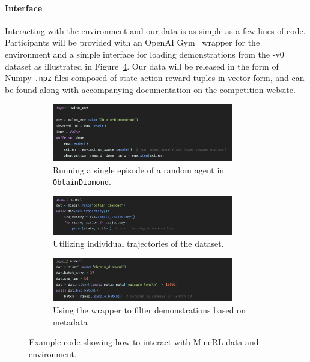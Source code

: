 \paragraph{Interface}
Interacting with the environment and our data is as simple as a few lines of code.
Participants will be provided with an OpenAI Gym~\cite{gym} wrapper for the environment and a simple interface for loading demonstrations from the \minenet-v0 dataset as illustrated in Figure~\ref{fig:example_code}. 
Our data will be released in the form of Numpy \texttt{.npz} files composed of state-action-reward tuples in vector form,
and can be found along with accompanying documentation on the competition website.

\begin{figure}
    \centering
    \begin{subfigure}[b]{0.87\textwidth}
    \centering 
        \includegraphics[width=0.87\textwidth]{./assets/malmo_env.png}
        \caption{\small Running a single episode of a random agent in \texttt{ObtainDiamond}. } 
        \label{fig:env_code}
    \end{subfigure}

    \begin{subfigure}[b]{0.87\textwidth}
    \centering
        \includegraphics[width=0.87\textwidth]{./assets/mineral_dat_1.png}
        \caption{\small Utilizing individual trajectories of the \minenet dataset.} 
        \label{fig:mineral_code_1}
    \end{subfigure}

\begin{subfigure}[b]{0.87\textwidth}
    \centering
        \includegraphics[width=0.87\textwidth]{./assets/mineral_dat_2.png}
        \caption{\small Using the \minenet  wrapper to filter demonstrations based on metadata} 
        \label{fig:mineral_code_2}
\end{subfigure}
\caption{\small Example code showing how to interact with MineRL data and environment.}
\label{fig:example_code}
\end{figure}

